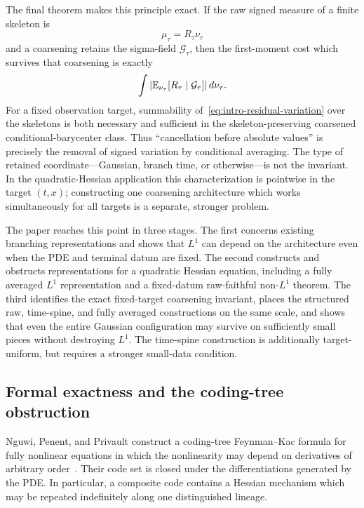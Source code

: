 The final theorem makes this principle exact. If the raw signed measure of a finite skeleton is
\begin{equation*}
  \mu_\tau=R_\tau\nu_\tau
\end{equation*}
and a coarsening retains the sigma-field $\mathcal G_\tau$, then the first-moment cost which survives that coarsening is exactly
\begin{equation}
  \int
  \left|
    \mathbb E_{\nu_\tau}[R_\tau\mid\mathcal G_\tau]
  \right|
  d\nu_\tau.
  \label{eq:intro-residual-variation}
\end{equation}
For a fixed observation target, summability of~\eqref{eq:intro-residual-variation} over the skeletons is both necessary and sufficient in the skeleton-preserving coarsened conditional-barycenter class. Thus ``cancellation before absolute values'' is precisely the removal of signed variation by conditional averaging. The type of retained coordinate---Gaussian, branch time, or otherwise---is not the invariant. In the quadratic-Hessian application this characterization is pointwise in the target $(t,x)$; constructing one coarsening architecture which works simultaneously for all targets is a separate, stronger problem.

The paper reaches this point in three stages. The first concerns existing branching representations and shows that $L^1$ can depend on the architecture even when the PDE and terminal datum are fixed. The second constructs and obstructs representations for a quadratic Hessian equation, including a fully averaged $L^1$ representation and a fixed-datum raw-faithful non-$L^1$ theorem. The third identifies the exact fixed-target coarsening invariant, places the structured raw, time-spine, and fully averaged constructions on the same scale, and shows that even the entire Gaussian configuration may survive on sufficiently small pieces without destroying $L^1$. The time-spine construction is additionally target-uniform, but requires a stronger small-data condition.

\subsection{Formal exactness and the coding-tree obstruction}

Nguwi, Penent, and Privault construct a coding-tree Feynman--Kac formula for fully nonlinear equations in which the nonlinearity may depend on derivatives of arbitrary order~\cite{NguwiPenentPrivault2023}. Their code set is closed under the differentiations generated by the PDE. In particular, a composite code contains a Hessian mechanism which may be repeated indefinitely along one distinguished lineage.

